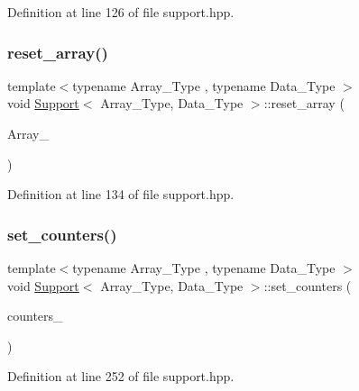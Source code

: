 Definition at line 126 of file support.\+hpp.

\mbox{\label{class_support_a4b3c832b8a6e84638ff89f346d0454cf}} 
\subsubsection{\texorpdfstring{reset\+\_\+array()}{reset\_array()}\hspace{0.1cm}{\footnotesize\ttfamily [2/2]}}
{\footnotesize\ttfamily template$<$typename Array\+\_\+\+Type , typename Data\+\_\+\+Type $>$ \\
void \hyperlink{class_support}{Support}$<$ Array\+\_\+\+Type, Data\+\_\+\+Type $>$\+::reset\+\_\+array (\begin{DoxyParamCaption}\item[{const Array\+\_\+\+Type $\ast$}]{Array\+\_\+ }\end{DoxyParamCaption})\hspace{0.3cm}{\ttfamily [inline]}}



Definition at line 134 of file support.\+hpp.

\mbox{\label{class_support_a6933478f6329793a6216e0326e79dff3}} 
\subsubsection{\texorpdfstring{set\+\_\+counters()}{set\_counters()}}
{\footnotesize\ttfamily template$<$typename Array\+\_\+\+Type , typename Data\+\_\+\+Type $>$ \\
void \hyperlink{class_support}{Support}$<$ Array\+\_\+\+Type, Data\+\_\+\+Type $>$\+::set\+\_\+counters (\begin{DoxyParamCaption}\item[{\hyperlink{class_counter_vector}{Counter\+Vector}$<$ Array\+\_\+\+Type, Data\+\_\+\+Type $>$ $\ast$}]{counters\+\_\+ }\end{DoxyParamCaption})\hspace{0.3cm}{\ttfamily [inline]}}



Definition at line 252 of file support.\+hpp.



